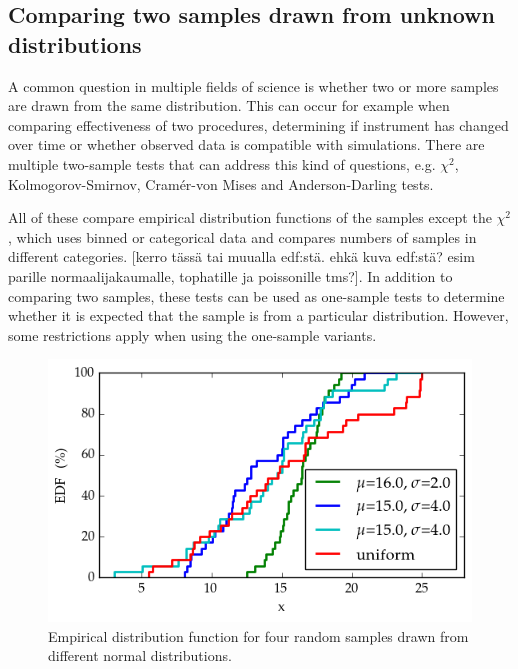 \documentclass[english, oneside]{HYgradu}
\begin{document}
\subsection{Comparing two samples drawn from unknown distributions}

A common question in multiple fields of science is whether two or more samples are drawn from the same distribution. This can occur for example when comparing effectiveness of two procedures, determining if instrument has changed over time or whether observed data is compatible with simulations. There are multiple two-sample tests that can address this kind of questions, e.g. $\chi^2$, Kolmogorov-Smirnov, Cram\'er-von Mises and Anderson-Darling tests. \citep{bohm2010introduction, feigelson2012modern}

All of these compare empirical distribution functions of the samples except the $\chi^2$, which uses binned or categorical data and compares numbers of samples in different categories. [kerro tässä tai muualla edf:stä. ehkä kuva edf:stä? esim parille normaalijakaumalle, tophatille ja poissonille tms?]. In addition to comparing two samples, these tests can be used as one-sample tests to determine whether it is expected that the sample is from a particular distribution. However, some restrictions apply when using the one-sample variants. %
\citep{feigelson2012modern}

\begin{figure}
   \centering
   \includegraphics[width=\textwidth]{kuvat/edf.png}
   \caption{Empirical distribution function for four random samples drawn from different normal distributions.}
   \label{fig:edf}
\end{figure}
\end{document}
